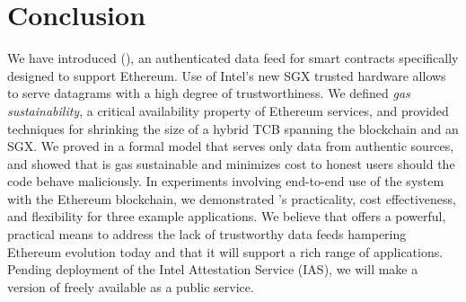 \section{Conclusion}
\label{sec:conclude}

We have introduced \tcs (\tc), an authenticated data feed for smart contracts specifically designed to support Ethereum.
Use of Intel's new SGX trusted hardware allows \tc to serve datagrams with a high degree of trustworthiness.
We defined \emph{gas sustainability}, a critical availability property of Ethereum services,
and provided techniques for shrinking the size of a hybrid TCB spanning the blockchain and an SGX.
We proved in a formal model that \tc serves only data from authentic sources,
and showed that \tc is gas sustainable and minimizes cost to honest users should the code behave maliciously.
In experiments involving end-to-end use of the system with the Ethereum blockchain, we demonstrated \tc's practicality, cost effectiveness, and flexibility for three example applications.
We believe that \tc offers a powerful, practical means to address the lack of trustworthy data feeds hampering Ethereum evolution today and that it will support a rich range of applications.
Pending deployment of the Intel Attestation Service (IAS), we will make a version of \tc freely available as a public service.

